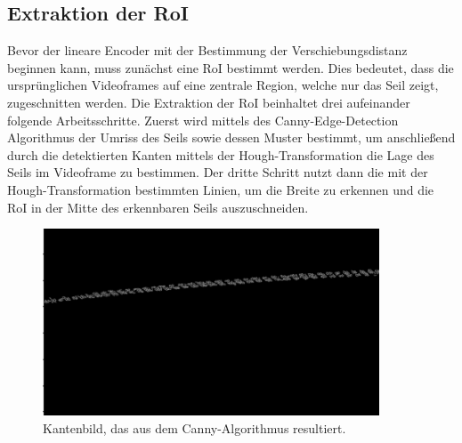 \documentclass[10pt,a4paper]{scrarticle}
\begin{document}
	\subsection{Extraktion der RoI}\label{RoI_Extraktion}
	Bevor der lineare Encoder mit der Bestimmung der Verschiebungsdistanz beginnen kann, muss zunächst eine RoI bestimmt werden. Dies bedeutet, dass die ursprünglichen Videoframes auf eine zentrale  Region, welche nur das Seil zeigt, zugeschnitten werden. Die Extraktion der RoI beinhaltet drei aufeinander folgende Arbeitsschritte. Zuerst wird mittels des Canny-Edge-Detection Algorithmus der Umriss des Seils sowie dessen Muster bestimmt, um anschließend durch die detektierten Kanten mittels der Hough-Transformation die Lage des Seils im Videoframe zu bestimmen. Der dritte Schritt nutzt dann die mit der Hough-Transformation bestimmten Linien, um die Breite zu erkennen und die RoI in der Mitte des erkennbaren Seils auszuschneiden. 

\begin{figure}
\includegraphics[width=10cm]{Abbildungen/cannyEdges.png}
  \centering
  \caption{Kantenbild, das aus dem Canny-Algorithmus resultiert.}
  \label{fig:CannyEdges}
\end{figure}
\end{document}
